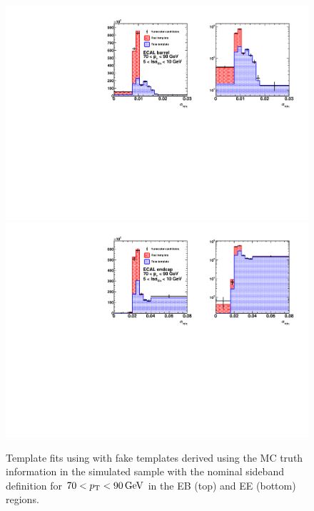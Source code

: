 \begin{figure}[!htbp]
  \centering
  \includegraphics[scale=0.63]{figures/closure_test_h_pt70To90_chIso5To10_EB_Truth_sieie.pdf}
  \includegraphics[scale=0.63]{figures/closure_test_h_pt70To90_chIso5To10_EE_Truth_sieie.pdf}
  \caption{Template fits using \sieie with fake templates derived using the MC truth information in the simulated sample with the nominal sideband definition for $70 < p_{\mathrm{T}} < 90\,\text{Ge\hspace{-.08em}V}$ in the EB (top) and EE (bottom) regions.}
  \label{fig:closure_test_truth_template_fit}
\end{figure}

